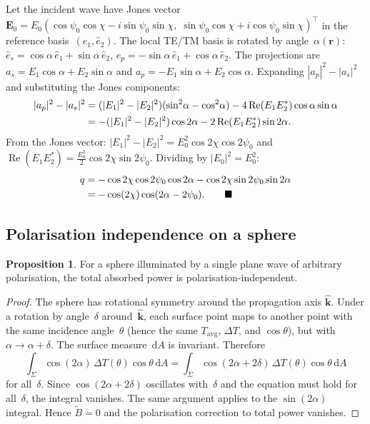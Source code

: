 \documentclass[11pt,a4paper]{article}
\theoremstyle{definition}      %
\newtheorem{proposition}[proposition]{Proposition}
\newcommand{\khat}{\hat{\bm{k}}}
\newcommand{\rr}{\mathbf{r}}
\newcommand{\Tavg}{T_{\mathrm{avg}}}
\DeclareMathOperator{\RE}{Re}
\newcommand{\diff}{\mathrm{d}}        %
\begin{document}
Let the incident wave have Jones vector
$\mathbf{E}_0=E_0(\cos\psi_0\cos\chi-i\sin\psi_0\sin\chi,\;
\sin\psi_0\cos\chi+i\cos\psi_0\sin\chi)^\top$ in the reference
basis~$(\hat{e}_1,\hat{e}_2)$.  The local TE/TM basis is rotated by
angle~$\alpha(\rr)$:
$\hat{e}_s=\cos\alpha\,\hat{e}_1+\sin\alpha\,\hat{e}_2$,
$\hat{e}_p=-\sin\alpha\,\hat{e}_1+\cos\alpha\,\hat{e}_2$.  The
projections are $a_s=E_1\cos\alpha+E_2\sin\alpha$ and
$a_p=-E_1\sin\alpha+E_2\cos\alpha$.  Expanding $|a_p|^2-|a_s|^2$
and substituting the Jones components:
\begin{align}
  |a_p|^2-|a_s|^2
  &= (|E_1|^2-|E_2|^2)(\sin^2\!\alpha-\cos^2\!\alpha)
    - 4\RE(E_1E_2^*)\cos\alpha\sin\alpha \notag\\
  &= -(|E_1|^2-|E_2|^2)\cos 2\alpha - 2\RE(E_1E_2^*)\sin 2\alpha.
\end{align}
From the Jones vector: $|E_1|^2-|E_2|^2=E_0^2\cos 2\chi\cos 2\psi_0$
and $\RE(E_1E_2^*)=\frac{E_0^2}{2}\cos 2\chi\sin 2\psi_0$.  Dividing
by $|E_0|^2=E_0^2$:
\begin{align}
  q &= -\cos 2\chi\cos 2\psi_0\cos 2\alpha
     - \cos 2\chi\sin 2\psi_0\sin 2\alpha \notag\\
    &= -\cos(2\chi)\cos(2\alpha-2\psi_0). \qquad\blacksquare
\end{align}

\subsection{Polarisation independence on a sphere}
\label{app:sphere-proof}

\begin{proposition}
For a sphere illuminated by a single plane wave of arbitrary
polarisation, the total absorbed power is polarisation-independent.
\end{proposition}

\begin{proof}
The sphere has rotational symmetry around the propagation axis $\khat$.
Under a rotation by angle~$\delta$ around~$\khat$, each surface point
maps to another point with the same incidence angle~$\theta$ (hence
the same $\Tavg$, $\Delta T$, and $\cos\theta$), but with
$\alpha\to\alpha+\delta$.  The surface measure~$\diff A$ is invariant.
Therefore
\[
  \int_\Sigma\cos(2\alpha)\,\Delta T(\theta)\cos\theta\,\diff A
  = \int_\Sigma\cos(2\alpha+2\delta)\,\Delta T(\theta)\cos\theta\,\diff A
\]
for all~$\delta$.  Since $\cos(2\alpha+2\delta)$ oscillates
with~$\delta$ and the equation must hold for all~$\delta$, the
integral vanishes.  The same argument applies to the $\sin(2\alpha)$
integral.  Hence $\tilde{B}=0$ and the polarisation correction to
total power vanishes.
\end{proof}
\end{document}
